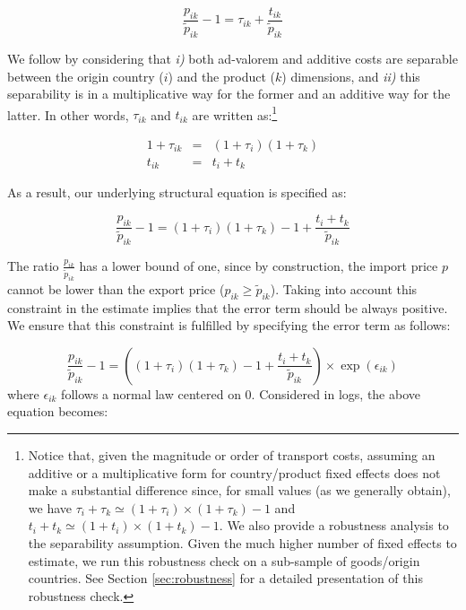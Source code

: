 \documentclass[a4paper,11pt]{article}
\begin{document}
\begin{equation}
\frac{p_{ik}}{\widetilde{p}_{ik}} -1 = \tau_{ik} +\frac{t_{ik}}{ \widetilde{p}_{ik}} \label{eq:base_estimee}
\end{equation}

We follow \cite{Irrazabal_2015} by considering that \textit{i)} both ad-valorem and additive costs are separable between the origin country ($i$) and the product ($k$) dimensions, and \textit{ii)} this separability is in a multiplicative way for the former and an additive way for the latter.
In other words, $\tau_{ik}$ and $t_{ik}$ are written as:\footnote{Notice that, given the magnitude or order of transport costs, assuming an additive or a multiplicative form for country/product fixed effects does not make a substantial difference since, for small values (as we generally obtain), we have $\tau_i+ \tau_k \simeq (1+\tau_i)\times(1+\tau_k) -1$ and $t_i+t_k\simeq (1+t_i)\times(1+t_k)-1$.
We also provide a robustness analysis to the separability assumption. Given the much higher number of fixed effects to estimate, we run this robustness check on a sub-sample of goods/origin countries. See Section \ref{sec:robustness} for a detailed presentation of this robustness check.}

\begin{eqnarray}
1+\tau_{ik} &=& (1+ \tau_{i})(1+ \tau_{k}) \label{eq:ad-valorem}\\
t_{ik} &=& t_{i} + t_{k} \label{eq:add}
\end{eqnarray}

\noindent As a result, our underlying structural equation is specified as:

\begin{equation*}
\frac{p_{ik}}{\widetilde{p}_{ik}}-1 =(1+\tau_{i})(1+\tau_{k}) -1 +\frac{t_{i} + t_{k}}{ \widetilde{p}_{ik}} \label{eq:theory_equation}
\end{equation*}

The ratio $\frac{p_{ik}}{\widetilde{p}_{ik}}$ has a lower bound of one, since by construction, the import price $p$ cannot be lower than the export price ($p_{ik}\geq\widetilde{p}_{ik}$). Taking into account this constraint in the estimate implies that the error term should be always positive.
We ensure that this constraint is fulfilled by specifying the error term as follows:

\begin{equation*}
\frac{p_{ik}}{\widetilde{p}_{ik}}-1 =\left((1+\tau_{i})(1+\tau_{k}) -1+\frac{t_{i} + t_{k}}{\widetilde{p}_{ik}} \right)\times \exp(\epsilon_{ik})
\end{equation*}
\noindent where $\epsilon_{ik}$ follows a normal law centered on 0.
Considered in logs, the above equation becomes:
\end{document}
